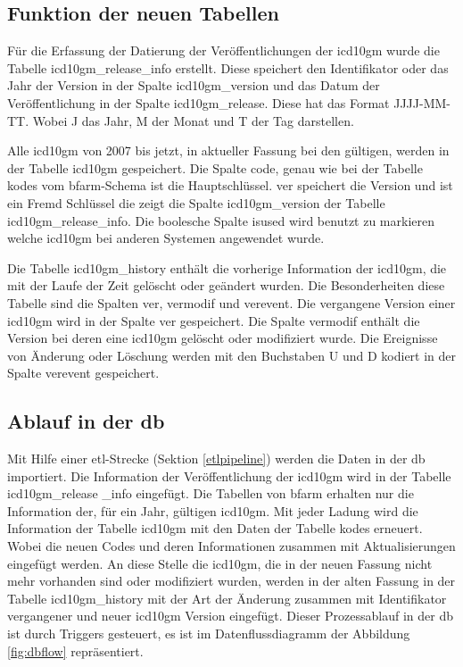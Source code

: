 \subsection{Funktion der neuen Tabellen} \label{newtables}

Für die Erfassung der Datierung der Veröffentlichungen der \ac{icd10gm} wurde die Tabelle {\ttfamily icd10gm\_release\_info} erstellt. Diese speichert den Identifikator oder das Jahr der Version in der Spalte {\ttfamily icd10gm\_version} und das Datum der Veröffentlichung in der Spalte {\ttfamily icd10gm\_release}. Diese hat das Format {\ttfamily JJJJ-MM-TT}. Wobei J das Jahr, M der Monat und T der Tag darstellen.

Alle \ac{icd10gm} von 2007 bis jetzt, in aktueller Fassung bei den gültigen, werden in der Tabelle {\ttfamily icd10gm} gespeichert. Die Spalte {\ttfamily code}, genau wie bei der Tabelle {\ttfamily kodes} vom \ac{bfarm}-Schema ist die Hauptschlüssel. {\ttfamily ver} speichert die Version und ist ein Fremd Schlüssel die zeigt die Spalte {\ttfamily icd10gm\_version} der Tabelle {\ttfamily icd10gm\_release\_info}. Die boolesche Spalte {\ttfamily isused} wird benutzt zu markieren welche \ac{icd10gm} bei anderen Systemen angewendet wurde.

Die Tabelle {\ttfamily icd10gm\_history} enthält die vorherige Information der \ac{icd10gm}, die mit der Laufe der Zeit gelöscht oder geändert wurden. Die Besonderheiten diese Tabelle sind die Spalten {\ttfamily ver}, {\ttfamily vermodif} und {\ttfamily verevent}. Die vergangene Version einer \ac{icd10gm} wird in der Spalte {\ttfamily ver} gespeichert. Die Spalte {\ttfamily vermodif} enthält die Version bei deren eine \ac{icd10gm} gelöscht oder modifiziert wurde. Die Ereignisse von Änderung oder Löschung werden mit den Buchstaben {\ttfamily U} \grqq{} und {\ttfamily D} \grqq{} kodiert in der Spalte {\ttfamily verevent} gespeichert.

\subsection{Ablauf in der \acl{db}} \label{dbrun}

Mit Hilfe einer \ac{etl}-Strecke (Sektion \ref{etlpipeline}) werden die Daten in der \ac{db} importiert. Die Information der Veröffentlichung der \ac{icd10gm} wird in der Tabelle {\ttfamily icd10gm\_release \_info} eingefügt. Die Tabellen von \ac{bfarm} erhalten nur die Information der, für ein Jahr, gültigen \ac{icd10gm}. Mit jeder Ladung wird die Information der Tabelle {\ttfamily icd10gm} mit den Daten der Tabelle {\ttfamily kodes} erneuert. Wobei die neuen Codes und deren Informationen zusammen mit Aktualisierungen eingefügt werden. An diese Stelle die \ac{icd10gm}, die in der neuen Fassung nicht mehr vorhanden sind oder modifiziert wurden, werden in der alten Fassung in der Tabelle {\ttfamily icd10gm\_history} mit der Art der Änderung zusammen mit Identifikator vergangener und neuer \ac{icd10gm} Version eingefügt. Dieser Prozessablauf in der \ac{db} ist durch Triggers gesteuert, es ist im Datenflussdiagramm der Abbildung \ref{fig:dbflow} repräsentiert.

